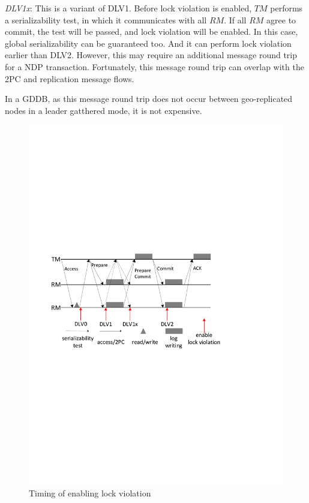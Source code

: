 \documentclass[conference]{IEEEtran}
\begin{document}
\emph{DLV1x}:
This is a variant of DLV1.
Before lock violation is enabled, ${TM}$ performs a serializability test, in which it communicates with all ${RM}$.
If all ${RM}$ agree to commit, the test will be passed, and lock violation will be enabled.
In this case, global serializability can be guaranteed too. And it can perform lock violation earlier than DLV2.
However, this may require an additional message round trip for a NDP transaction.
Fortunately, this message round trip can overlap with the 2PC and replication message flows.

In a GDDB, as this message round trip does not occur between geo-replicated nodes in a leader gatthered mode, it is not expensive.

\begin{figure}[tbp]
  \centerline{\includegraphics[scale=0.50]{figure/lock_violation_time.pdf}}
  \caption
  {Timing of enabling lock violation}
\label{fig:lock_violation_time}
\end{figure}
\end{document}
